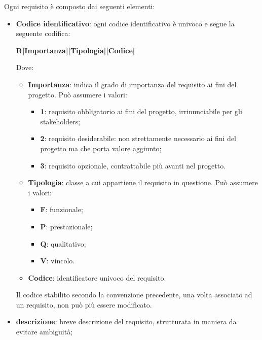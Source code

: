 \noindent Ogni requisito è composto dai seguenti elementi: 
\begin{itemize}
	\item{\textbf{Codice identificativo}}: ogni codice identificativo è univoco e segue la seguente codifica: 
		\begin{center}
			\textbf{R[Importanza][Tipologia][Codice]}
		\end{center}
		Dove:
		\begin{itemize}
			\item{\textbf{Importanza}: indica il grado di importanza del requisito ai fini del progetto. Può assumere i valori:}
			\begin{itemize}
				\item{\textbf{1}: requisito obbligatorio ai fini del progetto, irrinunciabile per gli stakeholders;}
				\item{\textbf{2}: requisito desiderabile: non strettamente necessario ai fini del progetto ma che porta valore aggiunto;}
				\item{\textbf{3}: requisito opzionale, contrattabile più avanti nel progetto.}
			\end{itemize}
		
			\item{\textbf{Tipologia}: classe a cui appartiene il requisito in questione. Può assumere i valori:}
			\begin{itemize}
				\item{\textbf{F}: funzionale;}
				\item{\textbf{P}: prestazionale;}
				\item{\textbf{Q}: qualitativo;}
				\item{\textbf{V}: vincolo.}
			\end{itemize}
			
			\item{\textbf{Codice}: identificatore univoco del requisito}.
		\end{itemize}
		
		\noindent Il codice stabilito secondo la convenzione precedente, una volta associato ad un requisito, non può più essere modificato.

	\item{\textbf{descrizione}}: breve descrizione del requisito, strutturata in maniera da evitare ambiguità; 
		

\end{itemize}
